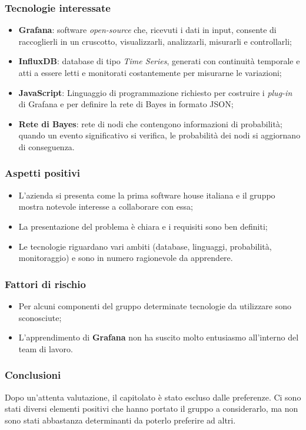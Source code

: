 \subsubsection{Tecnologie interessate}
\begin{itemize}
	\item \textbf{Grafana}: software \textit{open-source} che, ricevuti i dati in 
input,
	 consente di raccoglierli in un cruscotto, visualizzarli, analizzarli, 
	 misurarli e controllarli;
	\item \textbf{InfluxDB}: database di tipo \textit{Time Series}, generati con 
continuità
	 temporale e atti a essere letti e monitorati costantemente per misurarne 
	 le variazioni;
	\item \textbf{JavaScript}: Linguaggio di programmazione richiesto per costruire i \textit{plug-in} di Grafana e per definire la rete di Bayes in formato JSON\glo;
	\item \textbf{Rete di Bayes}: rete di nodi che contengono informazioni di 
probabilità; quando un evento significativo si verifica, le probabilità dei nodi si aggiornano di conseguenza.
\end{itemize}
\subsubsection{Aspetti positivi}
\begin{itemize}
	\item L'azienda si presenta come la prima software house italiana e il gruppo 
mostra 
	notevole interesse a collaborare con essa;
	\item La presentazione del problema è chiara e i requisiti sono ben definiti;
	\item Le tecnologie riguardano vari ambiti (database, linguaggi, probabilità, 
	monitoraggio) e sono in numero ragionevole da apprendere.
\end{itemize}
\subsubsection{Fattori di rischio}
\begin{itemize}
	\item Per alcuni componenti del gruppo determinate tecnologie da  utilizzare 
	sono sconosciute;
	\item L'apprendimento di \textbf{Grafana} non ha suscito molto 
	entusiasmo all'interno del team di lavoro.
\end{itemize}
\subsubsection{Conclusioni}
Dopo un'attenta valutazione, il capitolato è stato escluso dalle preferenze. Ci 
sono stati diversi elementi positivi che hanno portato il gruppo a considerarlo,
ma non sono stati abbastanza determinanti da poterlo preferire ad altri.

